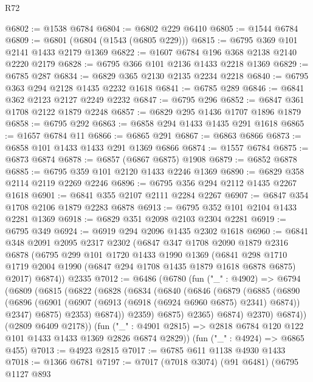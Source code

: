 \begin{lexlean}{R72}
\begin{coremodule}
@6802 := @1538 @6784
@6804 := @6802 @229 @6410
@6805 := @1544 @6784
@6809 := @6801 (@6804 (@1543 (@6805 @229)))
@6815 := @6795 @369 @101 @2141 @1433 @2179 @1369
@6822 := @1607 @6784 @196 @368 @2138 @2140 @2220 @2179
@6828 := @6795 @366 @101 @2136 @1433 @2218 @1369
@6829 := @6785 @287
@6834 := @6829 @365 @2130 @2135 @2234 @2218
@6840 := @6795 @363 @294 @2128 @1435 @2232 @1618
@6841 := @6785 @289
@6846 := @6841 @362 @2123 @2127 @2249 @2232
@6847 := @6795 @296
@6852 := @6847 @361 @1708 @2122 @1879 @2248
@6857 := @6829 @295 @1436 @1707 @1896 @1879
@6858 := @6795 @292
@6863 := @6858 @294 @1433 @1435 @291 @1618
@6865 := @1657 @6784 @11
@6866 := @6865 @291
@6867 := @6863 @6866
@6873 := @6858 @101 @1433 @1433 @291 @1369 @6866
@6874 := @1557 @6784
@6875 := @6873 @6874
@6878 := @6857 (@6867 @6875) @1908
@6879 := @6852 @6878
@6885 := @6795 @359 @101 @2120 @1433 @2246 @1369
@6890 := @6829 @358 @2114 @2119 @2269 @2246
@6896 := @6795 @356 @294 @2112 @1435 @2267 @1618
@6901 := @6841 @355 @2107 @2111 @2284 @2267
@6907 := @6847 @354 @1708 @2106 @1879 @2283 @6878
@6913 := @6795 @352 @101 @2104 @1433 @2281 @1369
@6918 := @6829 @351 @2098 @2103 @2304 @2281
@6919 := @6795 @349
@6924 := @6919 @294 @2096 @1435 @2302 @1618
@6960 := @6841
    @348
    @2091
    @2095
    @2317
    @2302
    (@6847
      @347
      @1708
      @2090
      @1879
      @2316
      @6878
      (@6795
        @299
        @101
        @1720
        @1433
        @1990
        @1369
        (@6841 @298 @1710 @1719 @2004 @1990 (@6847 @294 @1708 @1435 @1879 @1618 @6878 @6875) @2017)
        @6874))
    @2335
@7012 := @6486
    (@6780
      (fun ("_" : @4902) =>
      @6794
        (@6809
          (@6815
            (@6822
              (@6828
                (@6834
                  (@6840
                    (@6846
                      (@6879
                        (@6885
                          (@6890
                            (@6896
                              (@6901 (@6907 (@6913 (@6918 (@6924 @6960 @6875) @2341) @6874)) @2347)
                              @6875)
                            @2353)
                          @6874))
                      @2359)
                    @6875)
                  @2365)
                @6874)
              @2370)
            @6874))
        (@2809 @6409 @2178))
      (fun ("_" : @4901 @2815) => @2818 @6784 @120 @122 @101 @1433 @1433 @1369 @2826 @6874 @2829))
    (fun ("_" : @4924) => @6865 @455)
@7013 := @4923 @2815
@7017 := @6785 @611 @1138 @4930 @1433
@7018 := @1366 @6781
@7197 := @7017
    (@7018 @3074)
    (@91 @6481)
    (@6795
      @1127
      @893

\end{coremodule}
\end{lexlean}
